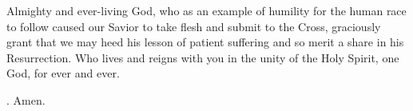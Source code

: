 \lettrine[lines=3]{A}{}lmighty and ever-living God,
who as an example of humility for the human race to follow
caused our Savior to take flesh and submit to the Cross,
graciously grant that we may heed his lesson of patient suffering
and so merit a share in his Resurrection.
Who lives and reigns with you in the unity of the Holy Spirit,
one God, for ever and ever. \par \Rbar. Amen.
